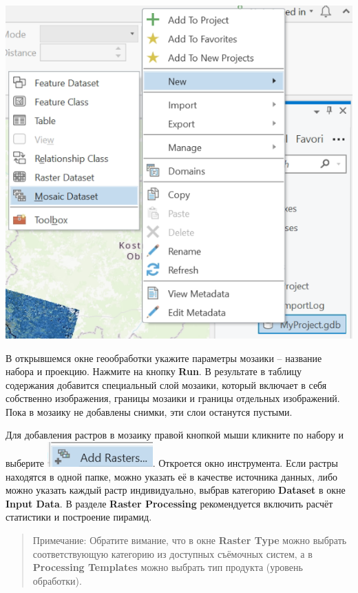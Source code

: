 \documentclass[
  12pt,
]{book}
\begin{document}
\includegraphics{images/Ref03/New_Mosaic.png}

В открывшемся окне геообработки укажите параметры мозаики -- название набора и проекцию. Нажмите на кнопку \textbf{Run}. В результате в таблицу содержания добавится специальный слой мозаики, который включает в себя собственно изображения, границы мозаики и границы отдельных изображений. Пока в мозаику не добавлены снимки, эти слои останутся пустыми.

Для добавления растров в мозаику правой кнопкой мыши кликните по набору и выберите \includegraphics{images/Ref03/Add_Rasters.png}. Откроется окно инструмента. Если растры находятся в одной папке, можно указать её в качестве источника данных, либо можно указать каждый растр индивидуально, выбрав категорию \textbf{Dataset} в окне \textbf{Input Data}. В разделе \textbf{Raster Processing} рекомендуется включить расчёт статистики и построение пирамид.

\begin{quote}
Примечание: Обратите вимание, что в окне \textbf{Raster Type} можно выбрать соответствующую категорию из доступных съёмочных систем, а в \textbf{Processing Templates} можно выбрать тип продукта (уровень обработки).
\end{quote}
\end{document}
